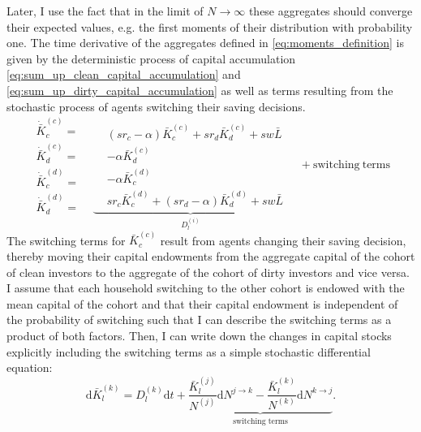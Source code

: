 Later, I use the fact that in the limit of $N \rightarrow \infty$ these aggregates should converge their expected values, e.g. the first moments of their distribution with probability one.
The time derivative of the aggregates defined in \eqref{eq:moments_definition} is given by the deterministic process of capital accumulation \eqref{eq:sum_up_clean_capital_accumulation} and \eqref{eq:sum_up_dirty_capital_accumulation} as well as terms resulting from the stochastic process of agents switching their saving decisions. 
\begin{equation}
      \begin{aligned}
          \dot{\bar{K}}_c^{(c)} =&  \\
          \dot{\bar{K}}_d^{(c)} =&  \\
          \dot{\bar{K}}_c^{(d)} =&  \\
          \dot{\bar{K}}_d^{(d)} =& 
      \end{aligned}
  \underbrace{ 
      \begin{aligned}
      &(sr_c - \alpha)\bar{K}_c^{(c)} + s r_d \bar{K}_d^{(c)} + s w \bar{L} \\
      &- \alpha\bar{K}_d^{(c)} \\
      &- \alpha\bar{K}_c^{(d)} \\
      &sr_c \bar{K}_c^{(d)} + (s r_d - \alpha)\bar{K}_d^{(d)} + s w \bar{L}
      \end{aligned}
  }_{\textstyle D^{(i)}_{l} } \quad + \mathrm{switching\ terms} \label{eq:sterm0}
\end{equation}
The switching terms for $\bar{K}_c^{(c)}$ result from agents changing their saving decision, thereby moving their capital endowments from the aggregate capital of the cohort of clean investors to the aggregate of the cohort of dirty investors and vice versa. I assume that each household switching to the other cohort is endowed with the mean capital of the cohort and that their capital endowment is independent of the probability of switching such that I can describe the switching terms as a product of both factors. Then, I can write down the changes in capital stocks explicitly including the switching terms as a simple stochastic differential equation:
\begin{equation}
	\mathrm{ d}\bar{K}_{l}^{(k)} = D^{(k)}_{l} \mathrm{ d}t + \underbrace{\frac{\bar{K}_l^{(j)}}{N^{(j)}} \mathrm{ d} N^{j \rightarrow k} -  \frac{\bar{K}_l^{(k)}}{N^{(k)}} \mathrm{ d} N^{k \rightarrow j} }_{\text{switching terms}}.
	\label{eq:aggregated_capital_time_derivative}
\end{equation}
